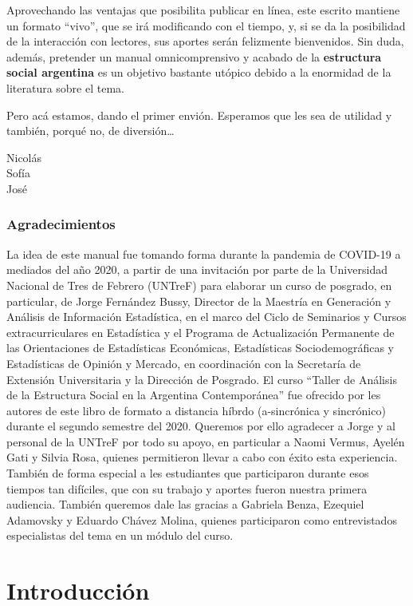 \documentclass[
]{book}
\begin{document}
Aprovechando las ventajas que posibilita publicar en línea, este escrito mantiene un formato ``vivo'', que se irá modificando con el tiempo, y, si se da la posibilidad de la interacción con lectores, sus aportes serán felizmente bienvenidos. Sin duda, además, pretender un manual omnicomprensivo y acabado de la \textbf{estructura social argentina} es un objetivo bastante utópico debido a la enormidad de la literatura sobre el tema.

Pero acá estamos, dando el primer envión. Esperamos que les sea de utilidad y también, porqué no, de diversión\ldots{}

Nicolás\\
Sofía\\
José

\hypertarget{agradecimientos}{%
\section*{Agradecimientos}\label{agradecimientos}}

La idea de este manual fue tomando forma durante la pandemia de COVID-19 a mediados del año 2020, a partir de una invitación por parte de la Universidad Nacional de Tres de Febrero (UNTreF) para elaborar un curso de posgrado, en particular, de Jorge Fernández Bussy, Director de la Maestría en Generación y Análisis de Información Estadística, en el marco del Ciclo de Seminarios y Cursos extracurriculares en Estadística y el Programa de Actualización Permanente de las Orientaciones de Estadísticas Económicas, Estadísticas Sociodemográficas y Estadísticas de Opinión y Mercado, en coordinación con la Secretaría de Extensión Universitaria y la Dirección de Posgrado. El curso ``Taller de Análisis de la Estructura Social en la Argentina Contemporánea'' fue ofrecido por les autores de este libro de formato a distancia híbrdo (a-sincrónica y sincrónico) durante el segundo semestre del 2020. Queremos por ello agradecer a Jorge y al personal de la UNTreF por todo su apoyo, en particular a Naomi Vermus, Ayelén Gati y Silvia Rosa, quienes permitieron llevar a cabo con éxito esta experiencia. También de forma especial a les estudiantes que participaron durante esos tiempos tan difíciles, que con su trabajo y aportes fueron nuestra primera audiencia. También queremos dale las gracias a Gabriela Benza, Ezequiel Adamovsky y Eduardo Chávez Molina, quienes participaron como entrevistados especialistas del tema en un módulo del curso.

\hypertarget{part-introducciuxf3n}{%
\part{Introducción}\label{part-introducciuxf3n}}
\end{document}
